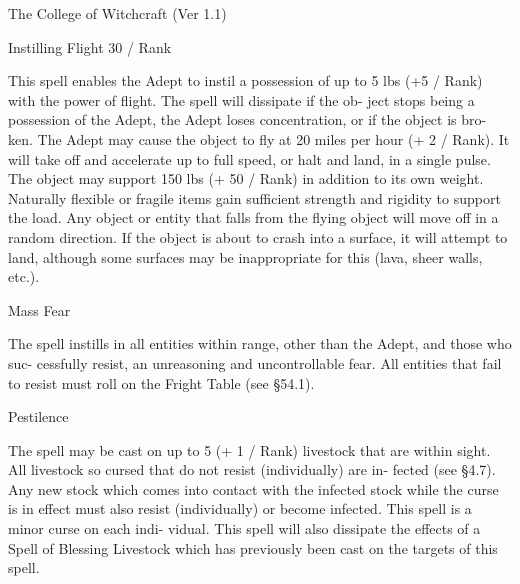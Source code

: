 \begin{Chapter}{The College of Witchcraft (Ver 1.1)}
\begin{spell}[S-14]{Instilling Flight }
30 / Rank 
\begin{effects}
 This  spell  enables  the  Adept  to  instil  a 
possession  of  up  to  5  lbs  (+5  /  Rank)  with  the 
power  of  flight.  The  spell  will  dissipate  if  the  ob-
ject  stops  being  a  possession  of  the  Adept,  the 
Adept  loses  concentration,  or  if  the  object  is  bro-
ken.  The  Adept  may  cause  the  object  to  fly  at  20 
miles  per  hour  (+  2  /  Rank).  It  will  take  off  and 
accelerate  up  to  full  speed,  or  halt  and  land,  in  a 
single pulse. The object may support 150 lbs (+ 50 
/  Rank)  in  addition  to  its  own  weight.  Naturally 
flexible or fragile items gain sufficient strength and 
rigidity  to  support  the  load.  Any  object  or  entity 
that falls from the flying object will  move off in a 
random  direction.  If  the  object  is  about  to  crash 
into  a  surface,  it  will  attempt  to  land,  although 
some  surfaces  may  be  inappropriate  for  this  (lava, 
sheer walls, etc.). 

\end{effects}
\end{spell}

\begin{spell}[S-15]{Mass Fear }

\begin{effects}
 The  spell  instills  in  all  entities  within 
range,  other  than  the  Adept,  and  those  who  suc-
cessfully  resist,  an  unreasoning  and uncontrollable 
fear.  All  entities  that  fail to  resist  must  roll  on  the 
Fright Table (see §54.1). 

\end{effects}
\end{spell}

\begin{spell}[S-16]{Pestilence }

\begin{effects}
 The  spell  may  be  cast  on  up  to  5  (+  1  / 
Rank) livestock that are within sight. All livestock 
so  cursed  that  do  not  resist  (individually)  are  in-
fected (see §4.7). Any new stock which comes into 
contact with the infected stock while the curse is in 
effect  must  also  resist  (individually)  or  become 
infected.  This  spell  is  a  minor  curse  on  each  indi-
vidual. This spell will also dissipate the effects of a 
Spell  of  Blessing  Livestock  which  has  previously 
been cast on the targets of this spell. 


\end{effects}
\end{spell}
\end{Chapter}
